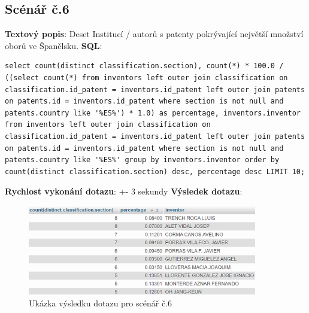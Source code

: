 \subsection{Scénář č.6}
\textbf{Textový popis}: Deset Institucí / autorů s patenty pokrývající největší množství oborů ve Španělsku.
\newline
\textbf{SQL}: 
\begin{lstlisting}[label = {lst:elements_a}]
select count(distinct classification.section), count(*) * 100.0 / ((select count(*) from inventors left outer join classification on classification.id_patent = inventors.id_patent left outer join patents on patents.id = inventors.id_patent where section is not null and patents.country like '%ES%') * 1.0) as percentage, inventors.inventor from inventors left outer join classification on classification.id_patent = inventors.id_patent left outer join patents on patents.id = inventors.id_patent where section is not null and patents.country like '%ES%' group by inventors.inventor order by count(distinct classification.section) desc, percentage desc LIMIT 10;
\end{lstlisting}
\textbf{Rychlost vykonání dotazu}: +- 3 sekundy
\newline
\textbf{Výsledek dotazu}:
\begin{figure}[H]
\centering
\includegraphics[width=10cm]{img/scenare/scenar_6}
\caption{Ukázka výsledku dotazu pro scénář č.6}
\label{fig:scenar6}
\end{figure}

